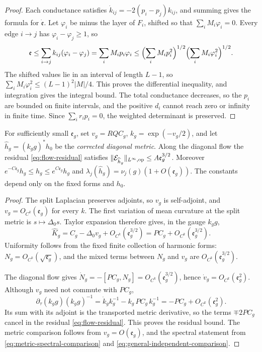 \begin{proof}
Each conductance satisfies $\dot k_{ij}=-2(p_i-p_j)k_{ij}$, and summing gives
the formula for $\dot{\mathfrak e}$. Let $\varphi_i$ be minus the layer of $F_i$,
shifted so that $\sum_iM_i\varphi_i=0$. Every edge $i\to j$ has
$\varphi_i-\varphi_j\ge1$, so
\[
 \mathfrak e\le\sum_{i\to j}k_{ij}(\varphi_i-\varphi_j)=\sum_iM_ip_i\varphi_i
 \le\Bigl(\sum_iM_ip_i^2\Bigr)^{1/2}\Bigl(\sum_iM_i\varphi_i^2\Bigr)^{1/2}.
\]
The shifted values lie in an interval of length $L-1$, so
$\sum_iM_i\varphi_i^2\le(L-1)^2|M|/4$. This proves the differential
inequality, and integration gives the integral bound. The total conductance
decreases,
so the $p_i$ are bounded on finite intervals, and the positive $d_i$ cannot
reach zero or infinity in finite time. Since $\sum_ir_ip_i=0$, the weighted
determinant is preserved.
\end{proof}

\begin{lemma}\label{lem:general-correction}
For sufficiently small $\mathfrak e_g$, set $v_g=RQC_g$, $k_g=\exp(-v_g/2)$, and
let $\widehat h_g=(k_gg)^*h_0$ be the \emph{corrected diagonal metric}. Along the diagonal flow the residual
\eqref{eq:flow-residual} satisfies
$\lVert\mathcal E_{\widehat h_g}\rVert_{L^\infty,\mathrm{op}}\le A\mathfrak e_g^{3/2}$.
Moreover $e^{-C\mathfrak e_g}h_g\le\widehat h_g\le e^{C\mathfrak e_g}h_g$ and
$\lambda_j(\widehat h_g)=\nu_j(g)(1+O(\mathfrak e_g))$. The constants depend only on
the fixed forms and $h_0$.
\end{lemma}

\begin{proof}
The split Laplacian preserves adjoints, so $v_g$ is self-adjoint, and
$v_g=O_{C^k}(\mathfrak e_g)$ for every $k$. The first variation of mean curvature at
the split metric is $s\mapsto\Delta_0s$. Taylor expansion therefore gives,
in the gauge $k_gg$,
\[
 \widehat K_g=C_g-\Delta_0v_g+O_{C^k}(\mathfrak e_g^{3/2})
 =PC_g+O_{C^k}(\mathfrak e_g^{3/2}).
\]
Uniformity follows from the fixed finite collection of harmonic forms:
$N_g=O_{C^k}(\sqrt{\mathfrak e_g})$, and the mixed terms between $N_g$ and $v_g$ are
$O_{C^k}(\mathfrak e_g^{3/2})$.

The diagonal flow gives $\dot N_g=-[PC_g,N_g]=O_{C^k}(\mathfrak e_g^{3/2})$, hence
$\dot v_g=O_{C^k}(\mathfrak e_g^2)$. Although $v_g$ need not commute with $PC_g$,
\[
 \partial_\tau(k_gg)(k_gg)^{-1}=\dot k_gk_g^{-1}-k_g\,PC_g\,k_g^{-1}
 =-PC_g+O_{C^k}(\mathfrak e_g^2).
\]
Its sum with its adjoint is the transported metric derivative, so the terms
$\mp2PC_g$ cancel in the residual \eqref{eq:flow-residual}. This proves the
residual bound. The metric comparison follows from $v_g=O(\mathfrak e_g)$, and the
spectral statement from \eqref{eq:metric-spectral-comparison} and
\eqref{eq:general-independent-comparison}.
\end{proof}

